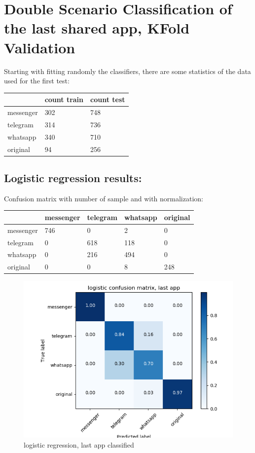 \chapter{Double Scenario Classification of the last shared app, KFold Validation}Starting with fitting randomly the classifiers, there are some statistics of the data used for the first test: \\
 {\def\arraystretch{1.3} 
 \begin{table}[H] 
\centering 
\begin{tabular}{|l|l|l|} 
\hline 
  &count train  &count test  \\ \hline
messenger  &302  &748  \\ \hline
telegram  &314  &736  \\ \hline
whatsapp  &340  &710  \\ \hline
original  &94  &256  \\ \hline
\end{tabular} 
\end{table} }
\section{Logistic regression results:} 
Confusion matrix with number of sample and with normalization:
 {\def\arraystretch{1.3} 
 \begin{table}[H] 
\centering 
\begin{tabular}{|l|l|l|l|l|} 
\hline 
  &messenger  &telegram  &whatsapp  &original  \\ \hline
messenger  &746  &0  &2  &0  \\ \hline
telegram  &0  &618  &118  &0  \\ \hline
whatsapp  &0  &216  &494  &0  \\ \hline
original  &0  &0  &8  &248  \\ \hline
\end{tabular} 
\end{table} }

 \begin{figure}[H] 
\centering 
\includegraphics[scale=.6]{images/new_met_lr_initial_double_simple.png} 
\caption{logistic regression, last app classified} 
\end{figure} 


